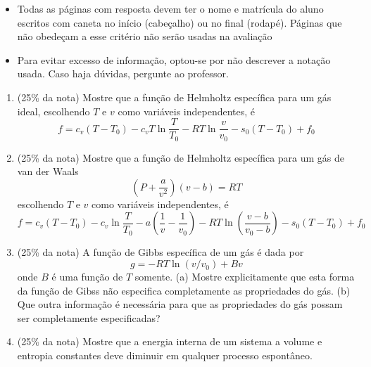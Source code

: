 \documentclass[12pt,a4paper,brazilian]{article}
\newcommand{\ratio}[1]{(#1\% da nota)}
\begin{document}
\begin{tcolorbox}[colback=black!10, colframe=black!50, title=Observações]
    \begin{itemize}
        \item Todas as páginas com resposta devem ter o nome e matrícula do
            aluno escritos com caneta no início (cabeçalho) ou no final
            (rodapé). Páginas que não obedeçam a esse critério não serão usadas
            na avaliação

        \item Para evitar excesso de informação, optou-se por não
            descrever a notação usada. Caso haja
            dúvidas, pergunte ao professor.
    \end{itemize}
\end{tcolorbox}

\vspace{2em}

\begin{enumerate}
    \item \ratio{25} Mostre que a função de Helmholtz específica para um gás ideal, escolhendo 
        \(T\) e \(v\) como variáveis independentes, é
        \[
            f=c_v(T-T_0) -c_v T \ln \frac{T}{T_0} - 
            RT\ln\frac{v}{v_0}-s_0(T-T_0) + f_0
        \]

    \item \ratio{25} Mostre que a função de Helmholtz específica para um gás de van der Waals
        \[
            \left(P+\frac{a}{v^2}\right)(v-b)=RT
        \]
        escolhendo \(T\) e \(v\) como variáveis independentes, é
        \[
            f=c_v (T-T_0) - c_v \ln \frac{T}{T_0} - a\left(\frac{1}{v}-
            \frac{1}{v_0}\right)-
            RT\ln\left(\frac{v-b}{v_0-b}\right)-s_0(T-T_0)+f_0
        \]

    \item \ratio{25} A função de Gibbs específica de um gás é dada por
        \[
            g = -RT\ln(v/v_0) + Bv
        \]
        onde \(B\) é uma função de \(T\) somente. (a) Mostre explicitamente
        que esta forma da função de Gibss não especifica completamente as 
        propriedades do gás. (b) Que outra informação é necessária para que as 
        propriedades do gás possam ser completamente especificadas?

    \item \ratio{25} Mostre que a energia interna de um sistema a volume e entropia
        constantes deve  diminuir em qualquer processo espontâneo.

\end{enumerate}
\end{document}

